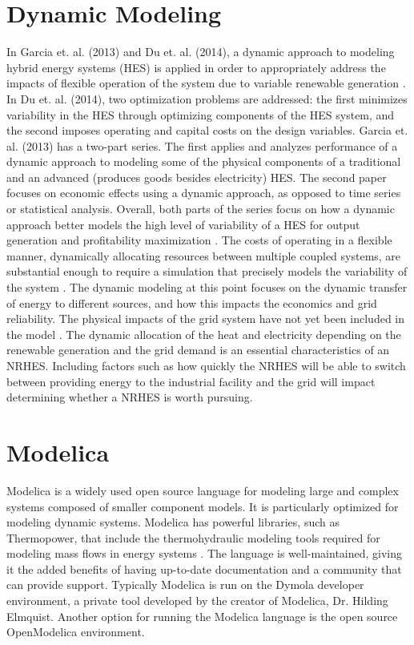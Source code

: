 \documentclass[12pt]{UIdahoMastersThesis}
\begin{document}
\section{Dynamic Modeling}
In Garcia et. al. (2013) and Du et. al. (2014), a dynamic approach to modeling hybrid energy systems (HES) is applied in order to appropriately address the impacts of flexible operation of the system due to variable renewable generation \cite{Garcia2013, Du2014}. In Du et. al. (2014), two optimization problems are addressed: the first minimizes variability in the HES through optimizing components of the HES system, and the second imposes operating and capital costs on the design variables. Garcia et. al. (2013) has a two-part series. The first applies and analyzes performance of a dynamic approach to modeling some of the physical components of a traditional and an advanced (produces goods besides electricity) HES. The second paper focuses on economic effects using a dynamic approach, as opposed to time series or statistical analysis. Overall, both parts of the series focus on how a dynamic approach better models the high level of variability of a HES for output generation and profitability maximization \cite{Garcia2013}. The costs of operating in a flexible manner, dynamically allocating resources between multiple coupled systems, are substantial enough to require a simulation that precisely models the variability of the system \cite{Garcia2013, Shropshire2011, Locatelli2015}. The dynamic modeling at this point focuses on the dynamic transfer of energy to different sources, and how this impacts the economics and grid reliability. The physical impacts of the grid system have not yet been included in the model \cite{Harrison2016}.  The dynamic allocation of the heat and electricity depending on the renewable generation and the grid demand is an essential characteristics of an NRHES.  Including factors such as how quickly the NRHES will be able to switch between providing energy to the industrial facility and the grid will impact determining whether a NRHES is worth pursuing.

\section{Modelica}
Modelica is a widely used open source language for modeling large and complex systems composed of smaller component models. It is particularly optimized for modeling dynamic systems. Modelica has powerful libraries, such as Thermopower, that include the thermohydraulic modeling tools required for modeling mass flows in energy systems \cite{Binder2014}. The language is well-maintained, giving it the added benefits of having up-to-date documentation and a community that can provide support. Typically Modelica is run on the Dymola developer environment, a private tool developed by the creator of Modelica, Dr. Hilding Elmquist. Another option for running the Modelica language is the open source OpenModelica environment.
\end{document}
